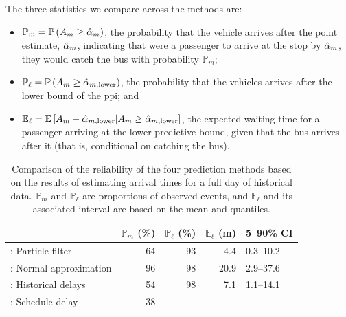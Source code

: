 The three statistics we compare across the methods are:
\begin{itemize}
\item $\mathbb{P}_m = \mathbb{P}\left(A_m \geq \hat{\alpha}_m\right)$, the probability that the vehicle arrives after the point estimate, $\hat{\alpha}_m$, indicating that were a passenger to arrive at the stop by $\hat{\alpha}_m$, they would catch the bus with probability $\mathbb{P}_m$;
\item $\mathbb{P}_\ell = \mathbb{P}\left(A_m \geq \hat\alpha_{m,\text{lower}}\right)$, the probability that the vehicles arrives after the lower bound of the \gls{ppi}; and
\item $\mathbb{E}_\ell = \mathbb{E}\left[A_m - \hat\alpha_{m,\text{lower}} | A_m \geq \hat\alpha_{m,\text{lower}}\right]$, the expected waiting time for a passenger arriving at the lower predictive bound, given that the bus arrives after it (that is, conditional on catching the bus).
\end{itemize}


\begin{knitrout}\small
{}\color{fgcolor}\begin{table}

\caption[Comparison of the reliability of the four prediction methods based on the results of estimating arrival times for a full day of historical data]{\label{tab:model_results_pr_miss}Comparison of the reliability of the four prediction methods based on the results of estimating arrival times for a full day of historical data. $\mathbb{P}_m$ and $\mathbb{P}_\ell$ are proportions of observed events, and $\mathbb{E}_\ell$ and its associated interval are based on the mean and quantiles.}
\centering
\fontsize{8}{10}\selectfont
\begin{tabular}[t]{lrrrl}
\toprule
  & $\mathbb{P}_m$ (\%) & $\mathbb{P}_\ell$ (\%) & $\mathbb{E}_\ell$ (m) & 5--90\% CI\\
\midrule
\Fpf{}: Particle filter & 64 & 93 & 4.4 & 0.3--10.2\\
\Fnorm{}: Normal approximation & 96 & 98 & 20.9 & 2.9--37.6\\
\Fhist{}: Historical delays & 54 & 98 & 7.1 & 1.1--14.1\\
\Fsched{}: Schedule-delay & 38 &  &  & \\
\bottomrule
\end{tabular}
\end{table}


\end{knitrout}

